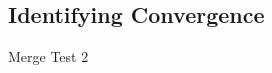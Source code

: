 \documentclass[12pt]{article}
\begin{document}


{\color{red}
%
%
\subsection{Identifying Convergence}
%
%
Merge Test 2
}
\end{document}
